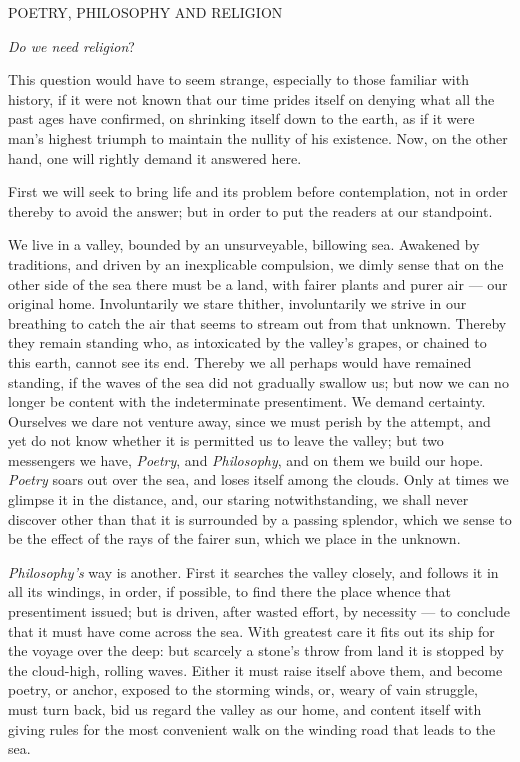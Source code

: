 \documentclass[12pt,a4paper,openany]{book}
\newcommand{\opage}[1]{\marginnote{\footnotesize\textit{[#1]}}}
\newcommand{\excerpthead}[1]{\par\bigskip\begin{center}#1\end{center}\nopagebreak\smallskip}
\begin{document}
\excerpthead{POETRY, PHILOSOPHY AND RELIGION}


\begin{center}\emph{Do we need religion}?\end{center}


This question would have to seem strange, especially to those familiar with
history, if it were not known that our time prides itself on denying what all the
past ages have confirmed, on shrinking itself down to the earth, as if it were man's
highest triumph to maintain the nullity of his existence. Now, on the other hand,
one will rightly demand it answered here.

First we will seek to bring life and its problem before contemplation, not in order
thereby to avoid the answer; but in order to put the readers at our standpoint.

We live in a valley, bounded by an unsurveyable, billowing sea. Awakened by
traditions, and driven by an inexplicable compulsion, we dimly sense that on the
other side of the sea there must be a land, with fairer plants and purer air ---
our original home. Involuntarily we stare thither, involuntarily we strive in our
breathing to catch the air that seems to stream out from that unknown. Thereby they
remain standing who, as intoxicated by the valley's grapes, or chained to this
earth, cannot see its end. Thereby we all perhaps would have remained standing, if
the waves of the sea did not gradually swallow us; but now we can no longer be
content with the indeterminate presentiment. We demand certainty. Ourselves we dare
not venture away, since we must perish by the attempt, and yet do not know whether
it is permitted us to leave the valley; but two messengers we have, \emph{Poetry},
and \emph{Philosophy}, and on them we build our hope. \emph{Poetry} soars out over
the sea, and loses itself among the clouds. Only at times we glimpse it in the
distance, and, our staring notwithstanding, we shall never discover other than that
it is surrounded by a passing splendor, which we sense to
\setcounter{footnote}{0}%
\opage{55}be the effect of the rays of the fairer sun, which we place in the unknown.

\emph{Philosophy's} way is another. First it searches the valley closely, and
follows it in all its windings, in order, if possible, to find there the place
whence that presentiment issued; but is driven, after wasted effort, by
necessity --- to conclude that it must have come across the sea. With greatest care
it fits out its ship for the voyage over the deep: but scarcely a stone's throw from
land it is stopped by the cloud-high, rolling waves. Either it must raise itself
above them, and become poetry, or anchor, exposed to the storming winds, or, weary
of vain struggle, must turn back, bid us regard the valley as our home, and content
itself with giving rules for the most convenient walk on the winding road that
leads to the sea.
\end{document}
